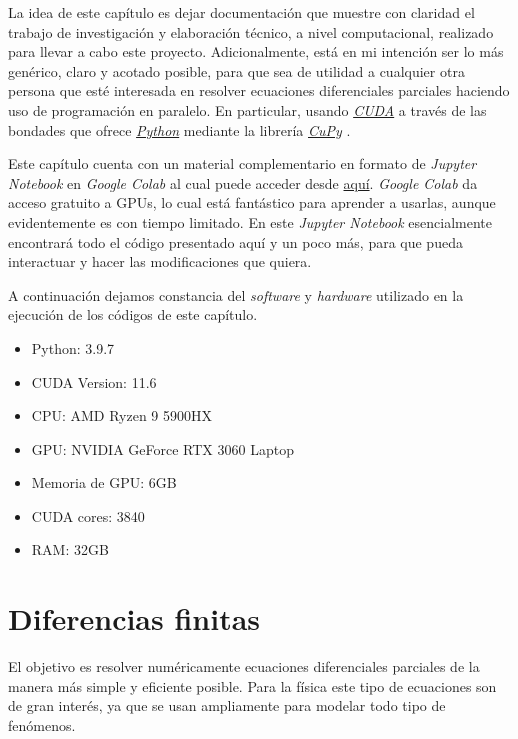 \graphicspath{{figs/cap4}}

La idea de este capítulo es dejar documentación que muestre con claridad el trabajo de investigación y elaboración técnico, a nivel computacional, realizado 
para llevar a cabo este proyecto. Adicionalmente, está en mi intención ser lo más genérico, claro y acotado posible, para que sea de utilidad a cualquier 
otra persona que esté interesada en resolver ecuaciones diferenciales parciales haciendo uso de programación en paralelo. En particular, usando 
\href{https://developer.nvidia.com/cuda-toolkit}{\textit{CUDA}} \cite{cuda} a través de las bondades que ofrece \href{https://www.python.org/}{\textit{Python}} \cite{python} mediante 
la librería \href{https://cupy.dev/}{\textit{CuPy}} \cite{cupy}.

Este capítulo cuenta con un material complementario en formato de \textit{Jupyter Notebook} en \textit{Google Colab} al cual puede acceder desde 
\href{https://colab.research.google.com/drive/13dfbe0GnIngJ2q3w2jLOlSO6mtFYZmA7?usp=sharing}{aquí}. \textit{Google Colab} da acceso gratuito a GPUs,
lo cual está fantástico para aprender a usarlas, aunque evidentemente es con tiempo limitado. En este \textit{Jupyter Notebook} esencialmente 
encontrará todo el código presentado aquí y un poco más, para que pueda interactuar y hacer las modificaciones que quiera.

A continuación dejamos constancia del \textit{software} y \textit{hardware} utilizado en la ejecución de los códigos de este capítulo.

\begin{itemize}
  \item Python: 3.9.7
  \item CUDA Version: 11.6
  \item CPU: AMD Ryzen 9 5900HX
  \item GPU: NVIDIA GeForce RTX 3060 Laptop
  \item Memoria de GPU: 6GB
  \item CUDA cores: 3840
  \item RAM: 32GB
\end{itemize}

\section{Diferencias finitas}
\label{S:diferencias finitas}

El objetivo es resolver numéricamente ecuaciones diferenciales parciales de la manera más simple y eficiente posible. Para la física este tipo de ecuaciones son de gran 
interés, ya que se usan ampliamente para modelar todo tipo de fenómenos. 


